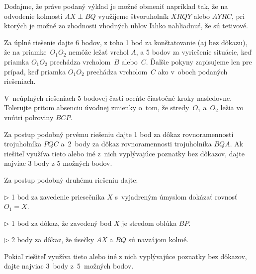 {Dodajme, že práve podaný výklad je možné obmeniť napríklad tak,
že na odvodenie kolmosti $AX\perp BQ$ využijeme štvoruholník $X\!RQY$
alebo $AY\!RC$, pri ktorých je možné zo zhodnosti vhodných uhlov
ľahko nahliadnuť, že sú tetivové.

\schemaABC
Za úplné riešenie dajte 6 bodov, z toho 1 bod za konštatovanie (aj bez dôkazu), že na priamke~$O_1O_2$ nemôže ležať
vrchol $A$, a 5 bodov za vyriešenie situácie, keď priamka
$O_1O_2$ prechádza vrcholom~$B$ alebo~$C$. Ďalšie pokyny zapisujeme
len pre prípad, keď priamka $O_1O_2$ prechádza vrcholom~$C$ ako
v~oboch podaných riešeniach.

V~neúplných riešeniach 5-bodovej časti oceňte
čiastočné kroky nasledovne. Tolerujte pritom absenciu úvodnej
zmienky o~tom, že stredy~$O_1$ a~$O_2$ ležia vo vnútri polroviny
$BCP$.

Za postup podobný prvému riešeniu dajte
1 bod za dôkaz rovnoramennosti trojuholníka $PQC$ a~2~body za
dôkaz rovnoramennosti trojuholníka $BQA$. Ak riešiteľ využíva tieto
alebo iné z~nich vyplývajúce poznatky bez dôkazov, dajte
najviac 3 body z 5 možných bodov.

Za postup podobný druhému riešeniu dajte:
\item{$\triangleright$} 1 bod za zavedenie priesečníka $X$ s~vyjadreným úmyslom dokázať rovnosť $O_1=X$.
\item{$\triangleright$} 1 bod za dôkaz, že zavedený bod $X$ je stredom oblúka $BP$.
\item{$\triangleright$} 2 body za dôkaz, že úsečky $AX$ a $BQ$ sú navzájom kolmé.

Pokiaľ riešiteľ využíva tieto alebo iné z nich vyplývajúce poznatky
bez dôkazov, dajte najviac 3~body z~5~možných bodov.
\endschema
}

